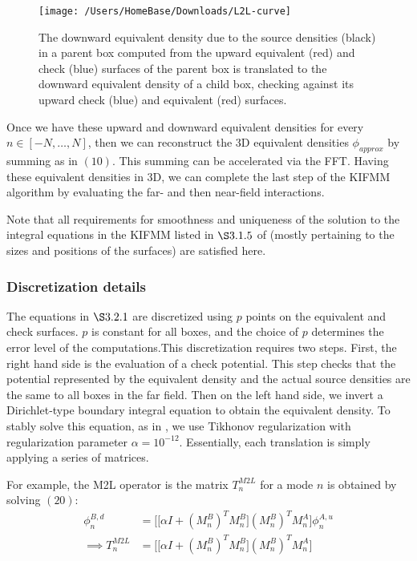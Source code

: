 \documentclass[12pt,letterpaper]{article}
\begin{document}
\begin{figure}[!ht]
\begin{center}
\texttt{[image: /Users/HomeBase/Downloads/L2L-curve]}
\end{center}
\caption{The downward equivalent density due to the source densities (black) in a parent box computed from the upward equivalent (red) and check (blue) surfaces of the parent box is translated to the downward equivalent density of a child box, checking against its upward check (blue) and equivalent (red) surfaces.}
\end{figure}

Once we have these upward and downward equivalent densities for every $n\in[-N,\dots,N]$, then we can reconstruct the 3D equivalent densities $\phi_{approx}$ by summing as in $(10)$. This summing can be accelerated via the FFT. Having these equivalent densities in 3D, we can complete the last step of the KIFMM algorithm by evaluating the far- and then near-field interactions.

Note that all requirements for smoothness and uniqueness of the solution to the integral equations in the KIFMM listed in $\S3.1.5$ of \cite{YBZ} (mostly pertaining to the sizes and positions of the surfaces) are satisfied here.

\subsubsection{Discretization details}
The equations in $\S3.2.1$ are discretized using $p$ points on the equivalent and check surfaces. $p$ is constant for all boxes, and the choice of $p$ determines the error level of the computations.This discretization requires two steps. First, the right hand side is the evaluation of a check potential. This step checks that the potential represented by the equivalent density and the actual source densities are the same to all boxes in the far field. Then on the left hand side, we invert a Dirichlet-type boundary integral equation to obtain the equivalent density. To stably solve this equation, as in \cite{YBZ}, we use Tikhonov regularization with regularization parameter $\alpha=10^{-12}$. Essentially, each translation is simply applying a series of matrices.

For example, the M2L operator is the matrix $T^{M2L}_n$ for a mode $n$ is obtained by solving $(20)$:
\begin{align}
\phi^{B,d}_n&=\bigg[\big[\alpha I +(M_n^B)^TM_n^B\big](M_n^B)^TM_n^A\bigg]\phi^{A,u}_n\\
\implies T^{M2L}_n &= \bigg[\big[\alpha I +(M_n^B)^TM_n^B\big](M_n^B)^TM_n^A\bigg]
\end{align}
\end{document}
